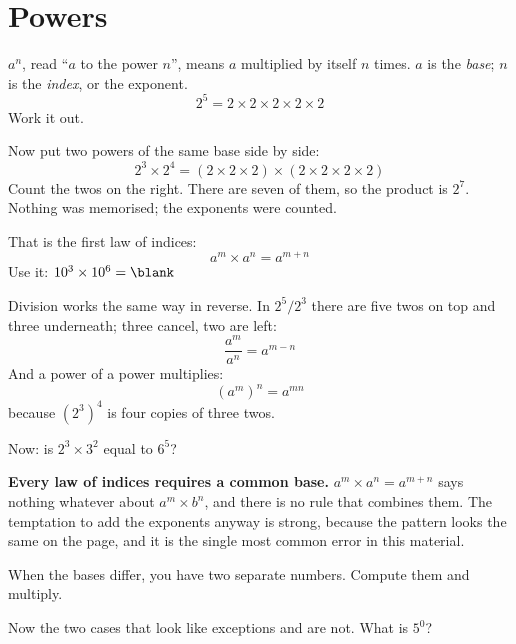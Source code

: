 \section{Powers}
\label{sec:F01-powers}

\begin{fr}
$a^{n}$, read \enquote{$a$ to the power $n$}, means $a$ multiplied by itself
$n$ times. $a$ is the \emph{base}; $n$ is the \emph{index}, or the exponent.
\[ 2^{5} = 2 \times 2 \times 2 \times 2 \times 2 \]
Work it out.
\nextframe
\end{fr}

\begin{fr}
Now put two powers of the same base side by side:
\[ 2^{3} \times 2^{4} = (2\times2\times2) \times (2\times2\times2\times2) \]
Count the twos on the right. There are seven of them, so the product is
$2^{7}$. Nothing was memorised; the exponents were counted.

That is the first law of indices:
\[ a^{m} \times a^{n} = a^{m+n} \]
Use it: $10^{3} \times 10^{6} = \blank$
\nextframe
\end{fr}

\begin{fr}
Division works the same way in reverse. In $2^{5} / 2^{3}$ there are five twos
on top and three underneath; three cancel, two are left:
\[ \frac{a^{m}}{a^{n}} = a^{m-n} \]
And a power of a power multiplies:
\[ (a^{m})^{n} = a^{mn} \]
because $(2^{3})^{4}$ is four copies of three twos.

Now: is $2^{3} \times 3^{2}$ equal to $6^{5}$?
\nextframe
\end{fr}

\begin{fr}
\begin{trapbox}
\textbf{Every law of indices requires a common base.} $a^{m}\times a^{n} =
a^{m+n}$ says nothing whatever about $a^{m} \times b^{n}$, and there is no rule
that combines them. The temptation to add the exponents anyway is strong,
because the pattern looks the same on the page, and it is the single most
common error in this material.

When the bases differ, you have two separate numbers. Compute them and
multiply.
\end{trapbox}
Now the two cases that look like exceptions and are not. What is $5^{0}$?
\nextframe
\end{fr}

